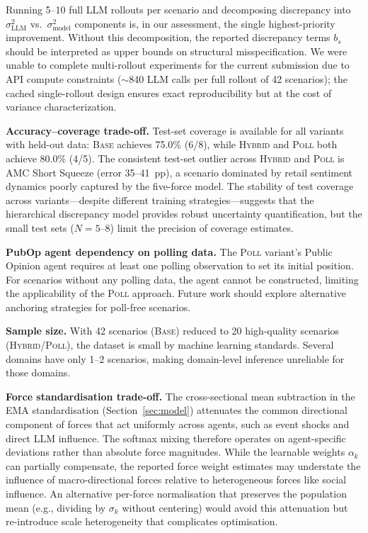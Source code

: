 \documentclass[12pt]{article}
\begin{document}
Running 5--10 full LLM rollouts per scenario and decomposing discrepancy into $\sigma^2_{\text{LLM}}$ vs.\ $\sigma^2_{\text{model}}$ components is, in our assessment, the single highest-priority improvement. Without this decomposition, the reported discrepancy terms $b_s$ should be interpreted as upper bounds on structural misspecification. We were unable to complete multi-rollout experiments for the current submission due to API compute constraints ($\sim$840 LLM calls per full rollout of 42 scenarios); the cached single-rollout design ensures exact reproducibility but at the cost of variance characterization.

\textbf{Accuracy--coverage trade-off.} Test-set coverage is available for all variants with held-out data: \textsc{Base} achieves 75.0\% (6/8), while \textsc{Hybrid} and \textsc{Poll} both achieve 80.0\% (4/5). The consistent test-set outlier across \textsc{Hybrid} and \textsc{Poll} is AMC Short Squeeze (error 35--41~pp), a scenario dominated by retail sentiment dynamics poorly captured by the five-force model. The stability of test coverage across variants---despite different training strategies---suggests that the hierarchical discrepancy model provides robust uncertainty quantification, but the small test sets ($N=5$--8) limit the precision of coverage estimates.

\textbf{PubOp agent dependency on polling data.} The \textsc{Poll} variant's Public Opinion agent requires at least one polling observation to set its initial position. For scenarios without any polling data, the agent cannot be constructed, limiting the applicability of the \textsc{Poll} approach. Future work should explore alternative anchoring strategies for poll-free scenarios.

\textbf{Sample size.} With 42 scenarios (\textsc{Base}) reduced to 20 high-quality scenarios (\textsc{Hybrid}/\textsc{Poll}), the dataset is small by machine learning standards. Several domains have only 1--2 scenarios, making domain-level inference unreliable for those domains.

\textbf{Force standardisation trade-off.} The cross-sectional mean subtraction in the EMA standardisation (Section~\ref{sec:model}) attenuates the common directional component of forces that act uniformly across agents, such as event shocks and direct LLM influence. The softmax mixing therefore operates on agent-specific deviations rather than absolute force magnitudes. While the learnable weights $\alpha_k$ can partially compensate, the reported force weight estimates may understate the influence of macro-directional forces relative to heterogeneous forces like social influence. An alternative per-force normalisation that preserves the population mean (e.g., dividing by $\sigma_k$ without centering) would avoid this attenuation but re-introduce scale heterogeneity that complicates optimisation.
\end{document}
